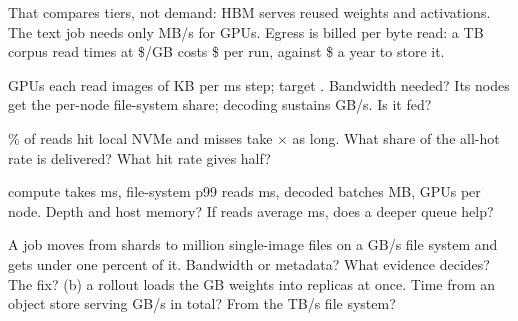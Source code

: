 \documentclass{studysheet}
\begin{document}
\begin{rightcol}
%
  {That compares tiers, not demand: HBM serves reused weights and activations. The text job needs
   only  MB/s for  GPUs.}{}
%
  {Egress is billed per byte read: a  TB corpus read  times at \$/GB
   costs \$ per run, against \$ a year to store it.}{}
\vspace{2pt}
\begin{qs}
\item \assumed{}  GPUs each read  images of  KB per  ms step;
  target . Bandwidth needed? Its  nodes get the per-node file-system share;
  decoding sustains  GB/s. Is it fed?
\item \assumed{} \% of reads hit local NVMe and misses take $\times$ as long. What
  share of the all-hot rate is delivered? What hit rate gives half?
\item \assumed{} compute takes  ms, file-system p99 reads  ms, decoded batches
   MB,  GPUs per node. Depth and host memory? If reads average  ms, does a deeper queue help?
\item A job moves from  shards to  million single-image files on a  GB/s file
  system and gets under one percent of it. Bandwidth or metadata? What evidence decides? The fix?
  (b) \assumed{} a rollout loads the  GB weights into  replicas at once. Time
  from an object store serving  GB/s in total? From the  TB/s file system?
\end{qs}
\end{rightcol}
\end{document}
